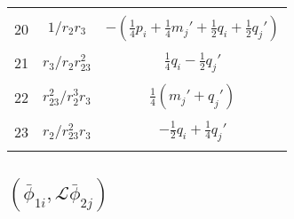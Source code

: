 \documentclass[Dissertation.tex]{subfiles}
\begin{document}
\begin{center}
\begin{longtable}{|c|c|c|}
&  &  \\
20  & $1/r_2 r_3$  & $-(\frac{1}{4}p_i + \frac{1}{4} m_j' + \frac{1}{2} q_i + \frac{1}{2} q_j')$ \\
&  &  \\
21  & $r_3/r_2 r_{23}^2$  & $\frac{1}{4} q_i - \frac{1}{2} q_j'$ \\
&  &  \\
22  & $r_{23}^2/r_2^3 r_3$  & $\frac{1}{4} (m_j' + q_j')$ \\
&  &  \\
23  & $r_2/r_{23}^2 r_3$  & $-\frac{1}{2} q_i + \frac{1}{4} q_j'$ \\
&  &  \\
\end{longtable}
\end{center}



\subsection{\texorpdfstring{${(\bar\phi_{1i}, \mathcal{L} \bar\phi_{2j})}$}{(phi1i, L phi2j)}}
\end{document}
